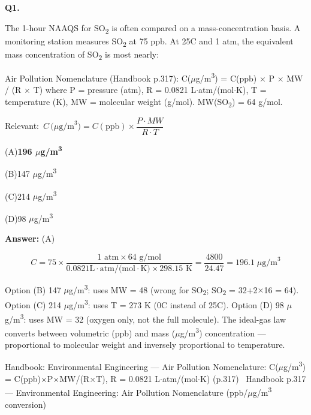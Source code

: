 \documentclass[11pt]{article}
\newcommand{\correct}[1]{\textbf{#1}\;{\color{accent}$\checkmark$}}
\newcommand{\optline}[2]{\par\noindent\hspace{1.2em}(#1)\hspace{0.6em}#2}
\begin{document}
\vspace{10pt}
\filbreak
\textbf{\color{accent}Q1.}\par\vspace{2pt}
The 1-hour NAAQS for SO\textsubscript{2} is often compared on a mass-concentration basis. A monitoring station measures SO\textsubscript{2} at 75 ppb. At 25\textdegree{}C and 1 atm, the equivalent mass concentration of SO\textsubscript{2} is most nearly:

Air Pollution Nomenclature (Handbook p.317):
C($\mu$g/m\textsuperscript{3}) = C(ppb) $\times$ P $\times$ MW / (R $\times$ T)
where P = pressure (atm), R = 0.0821 L$\cdot$atm/(mol$\cdot$K), T = temperature (K), MW = molecular weight (g/mol).
MW(SO\textsubscript{2}) = 64 g/mol.\par\vspace{3pt}
{\small\color{soft}Relevant:}\ $C\,\bigl(\mu\text{g/m}^3\bigr) = C(\text{ppb}) \times \dfrac{P \cdot MW}{R \cdot T}$\par\vspace{3pt}
\optline{A}{\correct{196 $\mu$g/m\textsuperscript{3}}}
\optline{B}{147 $\mu$g/m\textsuperscript{3}}
\optline{C}{214 $\mu$g/m\textsuperscript{3}}
\optline{D}{98 $\mu$g/m\textsuperscript{3}}
\par\vspace{3pt}
\vspace{2pt}\par\noindent\colorbox{boxbg}{\parbox{\dimexpr\linewidth-2\fboxsep\relax}{%
\vspace{2pt}\textbf{Answer:} (A)\par\vspace{2pt}
{\small \[C = 75 \times \frac{1\text{ atm}\times 64\text{ g/mol}}{0.0821\text{L}\!\cdot\!\text{atm/(mol}\!\cdot\!\text{K)}\times 298.15\text{ K}} = \frac{4800}{24.47} = 196.1\;\mu\text{g/m}^3\]

Option (B) 147 $\mu$g/m\textsuperscript{3}: uses MW = 48 (wrong for SO\textsubscript{2}; SO\textsubscript{2} = 32+2$\times$16 = 64). Option (C) 214 $\mu$g/m\textsuperscript{3}: uses T = 273 K (0\textdegree{}C instead of 25\textdegree{}C). Option (D) 98 $\mu$g/m\textsuperscript{3}: uses MW = 32 (oxygen only, not the full molecule). The ideal-gas law converts between volumetric (ppb) and mass ($\mu$g/m\textsuperscript{3}) concentration --- proportional to molecular weight and inversely proportional to temperature.}\par\vspace{2pt}
{\footnotesize\color{soft}Handbook: Environmental Engineering --- Air Pollution Nomenclature: C($\mu$g/m\textsuperscript{3}) = C(ppb)$\times$P$\times$MW/(R$\times$T), R = 0.0821 L$\cdot$atm/(mol$\cdot$K) (p.317) \textbullet\ Handbook p.317 --- Environmental Engineering: Air Pollution Nomenclature (ppb/$\mu$g/m\textsuperscript{3} conversion)}\vspace{2pt}
}}
\end{document}
